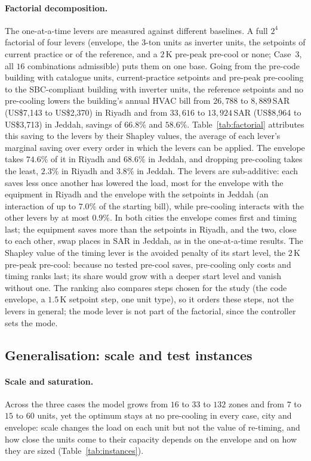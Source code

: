 \documentclass[10pt,a4paper,twocolumn]{article}
\theoremstyle{definition}
\begin{document}
\paragraph{Factorial decomposition.}\label{sec:factorial} The one-at-a-time levers are measured against different baselines. A full $2^4$ factorial of four levers (envelope, the 3-ton units as inverter units, the setpoints of current practice or of the reference, and a $2\,$K pre-peak pre-cool or none; Case~3, all $16$ combinations admissible) puts them on one base. Going from the pre-code building with catalogue units, current-practice setpoints and pre-peak pre-cooling to the SBC-compliant building with inverter units, the reference setpoints and no pre-cooling lowers the building's annual HVAC bill from $26{,}788$ to $8{,}889\,$SAR (US\$7{,}143 to US\$2{,}370) in Riyadh and from $33{,}616$ to $13{,}924\,$SAR (US\$8{,}964 to US\$3{,}713) in Jeddah, savings of $66.8\%$ and $58.6\%$. Table~\ref{tab:factorial} attributes this saving to the levers by their Shapley values, the average of each lever's marginal saving over every order in which the levers can be applied. The envelope takes $74.6\%$ of it in Riyadh and $68.6\%$ in Jeddah, and dropping pre-cooling takes the least, $2.3\%$ in Riyadh and $3.8\%$ in Jeddah. The levers are sub-additive: each saves less once another has lowered the load, most for the envelope with the equipment in Riyadh and the envelope with the setpoints in Jeddah (an interaction of up to $7.0\%$ of the starting bill), while pre-cooling interacts with the other levers by at most $0.9\%$. In both cities the envelope comes first and timing last; the equipment saves more than the setpoints in Riyadh, and the two, close to each other, swap places in SAR in Jeddah, as in the one-at-a-time results. The Shapley value of the timing lever is the avoided penalty of its start level, the $2\,$K pre-peak pre-cool: because no tested pre-cool saves, pre-cooling only costs and timing ranks last; its share would grow with a deeper start level and vanish without one. The ranking also compares steps chosen for the study (the code envelope, a $1.5\,$K setpoint step, one unit type), so it orders these steps, not the levers in general; the mode lever is not part of the factorial, since the controller sets the mode.

\subsection{Generalisation: scale and test instances}\label{sec:generalisation}
\paragraph{Scale and saturation.}\label{sec:threshold} Across the three cases the model grows from $16$ to $33$ to $132$ zones and from $7$ to $15$ to $60$ units, yet the optimum stays at no pre-cooling in every case, city and envelope: scale changes the load on each unit but not the value of re-timing, and how close the units come to their capacity depends on the envelope and on how they are sized (Table~\ref{tab:instances}).
\end{document}
